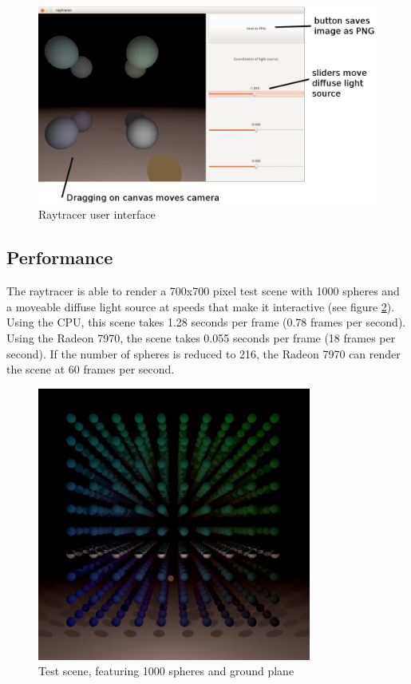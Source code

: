 \documentclass{article}
\begin{document}
\begin{figure}[ht!]
\centering
\includegraphics[width=120mm]{raytracer-ui.png}
\caption{Raytracer user interface}
\label{fig:raytracerui}
\end{figure}

\subsection{Performance}
The raytracer is able to render a 700x700 pixel test scene with 1000 spheres and a moveable diffuse light source at speeds that make it interactive (see figure \ref{fig:testscene}). Using the CPU, this scene takes 1.28 seconds per frame (0.78 frames per second). Using the Radeon 7970, the scene takes 0.055 seconds per frame (18 frames per second). If the number of spheres is reduced to 216, the Radeon 7970 can render the scene at 60 frames per second.

\begin{figure}[ht!]
\centering
\includegraphics[width=90mm]{scene.png}
\caption{Test scene, featuring 1000 spheres and ground plane}
\label{fig:testscene}
\end{figure}
\end{document}
